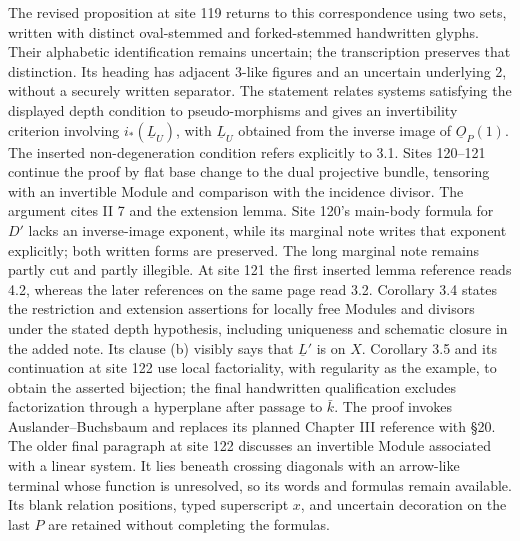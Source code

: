 The revised proposition at site 119 returns to this correspondence using two sets, written with distinct oval-stemmed and forked-stemmed handwritten glyphs. Their alphabetic identification remains uncertain; the transcription preserves that distinction. Its heading has adjacent 3-like figures and an uncertain underlying 2, without a securely written separator. The statement relates systems satisfying the displayed depth condition to pseudo-morphisms and gives an invertibility criterion involving $i_*(\underline L_U)$, with $\underline L_U$ obtained from the inverse image of $\underline O_P(1)$. The inserted non-degeneration condition refers explicitly to 3.1. Sites 120--121 continue the proof by flat base change to the dual projective bundle, tensoring with an invertible Module and comparison with the incidence divisor. The argument cites II 7 and the extension lemma. Site 120's main-body formula for $D'$ lacks an inverse-image exponent, while its marginal note writes that exponent explicitly; both written forms are preserved. The long marginal note remains partly cut and partly illegible. At site 121 the first inserted lemma reference reads 4.2, whereas the later references on the same page read 3.2. Corollary 3.4 states the restriction and extension assertions for locally free Modules and divisors under the stated depth hypothesis, including uniqueness and schematic closure in the added note. Its clause (b) visibly says that $\underline L'$ is on $X$. Corollary 3.5 and its continuation at site 122 use local factoriality, with regularity as the example, to obtain the asserted bijection; the final handwritten qualification excludes factorization through a hyperplane after passage to $\bar k$. The proof invokes Auslander--Buchsbaum and replaces its planned Chapter III reference with \S 20. The older final paragraph at site 122 discusses an invertible Module associated with a linear system. It lies beneath crossing diagonals with an arrow-like terminal whose function is unresolved, so its words and formulas remain available. Its blank relation positions, typed superscript $x$, and uncertain decoration on the last $P$ are retained without completing the formulas.
